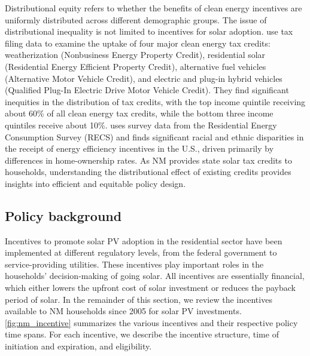 \documentclass[11pt,twoside,letterpaper]{article}
\begin{document}
Distributional equity refers to whether the benefits of clean energy incentives are uniformly distributed across different demographic groups. The issue of distributional inequality is not limited to incentives for solar adoption. \textcite{borenstein_distributional_2016} use tax filing data to examine the uptake of four major clean energy tax credits: weatherization (Nonbusiness Energy Property Credit), residential solar (Residential Energy Efficient Property Credit), alternative fuel vehicles (Alternative Motor Vehicle Credit), and electric and plug-in hybrid vehicles (Qualified Plug-In Electric Drive Motor Vehicle Credit). They find significant inequities in the distribution of tax credits, with the top income quintile receiving about 60\% of all clean energy tax credits, while the bottom three income quintiles receive about 10\%. \textcite{jacobsen_race_2024} uses survey data from the Residential Energy Consumption Survey (RECS) and finds significant racial and ethnic disparities in the receipt of energy efficiency incentives in the U.S., driven primarily by differences in home-ownership rates. As NM provides state solar tax credits to households, understanding the distributional effect of existing credits provides insights into efficient and equitable policy design.

\subsection[Policy background]{Policy background}

Incentives to promote solar PV adoption in the residential sector have been implemented at different regulatory levels, from the federal government to service-providing utilities. These incentives play important roles in the households' decision-making of going solar. All incentives are essentially financial, which either lowers the upfront cost of solar investment or reduces the payback period of solar. In the remainder of this section, we review the incentives available to NM households since 2005 for solar PV investments. \autoref{fig:nm_incentive} summarizes the various incentives and their respective policy time spans. For each incentive, we describe the incentive structure, time of initiation and expiration, and eligibility. 
\end{document}
